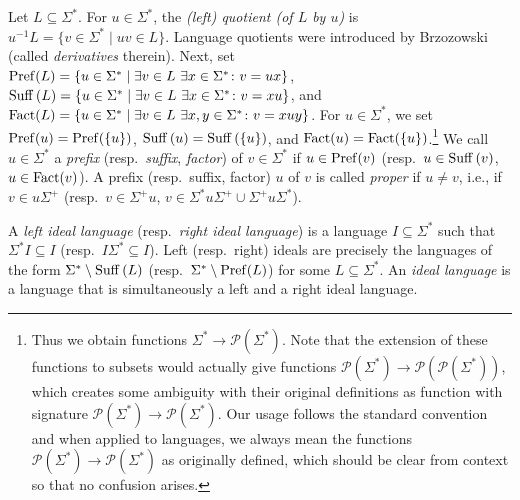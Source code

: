 \label{def:pref} 
\label{def:suff} 
\label{def:fact}
\label{def:quotient}
Let $L \subseteq \Sigma^*$. For $u \in \Sigma^*$, 
the \emph{(left) quotient (of $L$ by $u$)} 
is $u^{-1}L = \{ v \in \Sigma^* \mid uv \in L \}$.
Language quotients were introduced 
by Brzozowski~\cite{DBLP:journals/jacm/Brzozowski64} (called \emph{derivatives} therein).
Next, set $\pref{L} = \{ u \in \Sigma^* \mid \exists v \in L \ \exists x \in \Sigma^* \colon v = ux \}$,
$\suff{L} = \{ u \in \Sigma^* \mid \exists v \in L \ \exists x \in \Sigma^* \colon v = xu \}$,
and $\fact{L} = \{ u \in \Sigma^* \mid \exists v \in L \ \exists x,y \in \Sigma^* \colon v = xuy \}$.
For $u \in \Sigma^*$, we set $\operatorname{Pref}(u) = \operatorname{Pref}(\{u\})$, $\operatorname{Suff}\left(u\right) = \operatorname{Suff}\left(\{u\}\right)$,
and $\operatorname{Fact}(u) = \operatorname{Fact}(\{u\})$.\footnote{Thus we obtain functions $\Sigma^* \to \mathcal P(\Sigma^*)$.
	Note that the extension of these functions to subsets
	would actually give functions $\mathcal P(\Sigma^*) \to \mathcal P(\mathcal P(\Sigma^*))$,
	which creates some ambiguity with their original definitions
	as function with signature $\mathcal P(\Sigma^*) \to \mathcal P(\Sigma^*)$.
	Our usage follows the standard convention and when applied to languages, we always
	mean the functions $\mathcal P(\Sigma^*) \to \mathcal P(\Sigma^*)$
	as originally defined, which should be clear from context so that no confusion arises.}
We call $u \in \Sigma^*$ 
a \emph{prefix} (resp.~\emph{suffix}, \emph{factor})
of $v \in \Sigma^*$ if $u \in \operatorname{Pref}(v)$ (resp.~$u \in \operatorname{Suff}\left(v\right)$, $u \in \operatorname{Fact}(v)$).
A prefix (resp.~suffix, factor) $u$ of $v$ is called \emph{proper}
if $u\ne v$, i.e., if $v \in u\Sigma^+$ (resp.~$v \in \Sigma^+u$, $v \in \Sigma^*u\Sigma^+ \cup \Sigma^+u\Sigma^*$).

A \emph{left ideal language} (resp.~\emph{right ideal language})
is a language $I \subseteq \Sigma^*$ such that $\Sigma^* I \subseteq I$ (resp.~$I\Sigma^* \subseteq I$).
Left (resp.~right) ideals are precisely the languages of the form $\Sigma^* \setminus \operatorname{Suff}\left(L\right)$ 
(resp.~$\Sigma^* \setminus \operatorname{Pref}(L)$) for some $L \subseteq \Sigma^*$.
An \emph{ideal language} is a language that is simultaneously a left and a right ideal language.


